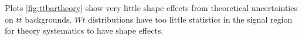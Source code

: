 %

Plots \ref{fig:ttbartheory} show very little shape effects from theoretical uncertainties on $t\bar{t}$ backgrounds. $Wt$ distributions have too little statistics in the signal region for theory systematics to have shape effects.

